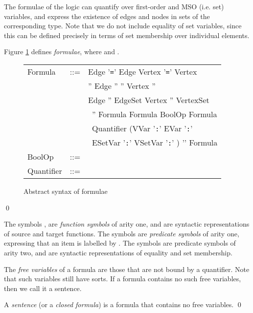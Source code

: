 \documentclass{llncs}
\newcommand{\mt}[1]{\text{\tt{#1}}}
\begin{document}
	The formulae of the logic can quantify over first-order and MSO (i.e. set) variables, and express the existence of edges and nodes in sets of the corresponding type. Note that we do not include equality of set variables, since this can be defined precisely in terms of set membership over individual elements.
	
	
	\begin{definition}[Formulae]\label{defn:app:formulae}\rm
		Figure \ref{fig:app:ms_formula_syntax} defines \emph{formulae}, where  and .

	\begin{figure}[htb]
	\renewcommand{\arraystretch}{1.2}
	\begin{center}
	\begin{tabular}{lcl}
	Formula & ::= &     Edge '\verb#=#' Edge  Vertex '\verb#=#' Vertex\\
	&&   '' Edge ''   '' Vertex '' \\
	&&  Edge '' EdgeSet  Vertex '' VertexSet \\
	&& \ '' Formula  Formula BoolOp Formula  \\
	&& \ Quantifier (VVar '\texttt{:}'  EVar '\texttt{:}'\\
	&& \hspace{0.25in} \ ESetVar '\texttt{:}'  VSetVar '\texttt{:}' ) '\mt{.}' Formula \\
	BoolOp & ::= &        \\
	Quantifier & ::= &   
	\end{tabular}
	\end{center}
	\caption{Abstract syntax of formulae}\label{fig:app:ms_formula_syntax}
	\end{figure}

	\qed
	\end{definition}
	
The symbols ,  are \emph{function symbols} of arity one, and are syntactic representations of source and target functions. The symbols  are \emph{predicate symbols} of arity one, expressing that an item is labelled by . The symbols  are predicate symbols of arity two, and are syntactic representations of equality and set membership.
	
	The \emph{free variables} of a formula are those that are not bound by a quantifier. Note that such variables still have sorts. If a formula contains no such free variables, then we call it a sentence.

	\begin{definition}[Sentence]\label{defn:sentence}\rm
		A \emph{sentence} (or a \emph{closed formula}) is a formula that contains no free variables.
	\qed
	\end{definition}
	
\end{document}
